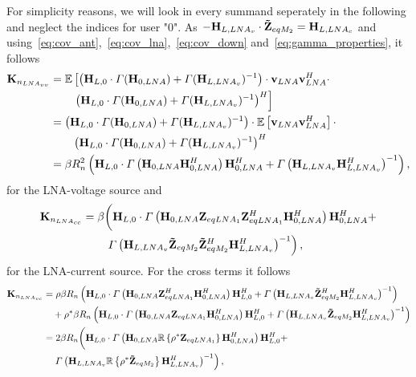 For simplicity reasons, we will look in every summand seperately in the following and neglect the indices for user "0".
As $-\mathbf{H}_{L,LNA_v}\cdot\mathbf{\tilde{Z}}_{eqM_2} = \mathbf{H}_{L,LNA_c}$ and using~\eqref{eq:cov_ant},~\eqref{eq:cov_lna},~\eqref{eq:cov_down} and~\eqref{eq:gamma_properties}, it follows
\begin{align}
\nonumber
\mathbf{K}_{n_{LNA_{vv}}} &= \mathbb{E}\left[\left(\mathbf{H}_{L,0}\cdot\Gamma(\mathbf{H}_{0,LNA})+\Gamma(\mathbf{H}_{L,LNA_v})^{-1}\right)\cdot\mathbf{v}_{LNA}\mathbf{v}_{LNA}^H\cdot\right.\\\nonumber
&\qquad\left.\left(\mathbf{H}_{L,0}\cdot\Gamma(\mathbf{H}_{0,LNA})+\Gamma(\mathbf{H}_{L,LNA_v})^{-1}\right)^H\right]\\\nonumber
&=\left(\mathbf{H}_{L,0}\cdot\Gamma(\mathbf{H}_{0,LNA})+\Gamma(\mathbf{H}_{L,LNA_v})^{-1}\right)\cdot\mathbb{E}\left[\mathbf{v}_{LNA}\mathbf{v}_{LNA}^H\right]\cdot\\\nonumber
&\qquad\left(\mathbf{H}_{L,0}\cdot\Gamma(\mathbf{H}_{0,LNA})+\Gamma(\mathbf{H}_{L,LNA_v})^{-1}\right)^H\\
&=\beta R_n^2\left(\mathbf{H}_{L,0}\cdot\Gamma\left(\mathbf{H}_{0,LNA}\mathbf{H}_{0,LNA}^H\right)\mathbf{H}_{0,LNA}^H+\Gamma\left(\mathbf{H}_{L,LNA_v}\mathbf{H}_{L,LNA_v}^H\right)^{-1}\right),
\end{align}
for the LNA-voltage source and
\begin{align}
\nonumber
\mathbf{K}_{n_{LNA_{cc}}} &= 
\beta \biggl(\mathbf{H}_{L,0}\cdot\Gamma\left(\mathbf{H}_{0,LNA}\mathbf{Z}_{eqLNA_1}\mathbf{Z}_{eqLNA_1}^H\mathbf{H}_{0,LNA}^H\right)\mathbf{H}_{0,LNA}^H+\\
&\qquad\left.\Gamma\left(\mathbf{H}_{L,LNA_v}\mathbf{\tilde{Z}}_{eqM_2}\mathbf{\tilde{Z}}_{eqM_2}^H\mathbf{H}_{L,LNA_v}^H\right)^{-1}\right),
\end{align}
for the LNA-current source.
For the cross terms it follows
\begin{align}
\nonumber
\mathbf{K}_{n_{LNA_{vc}}} &= \rho\beta R_n
\left(\mathbf{H}_{L,0}\cdot\Gamma\left(\mathbf{H}_{0,LNA}\mathbf{Z}_{eqLNA_1}^H\mathbf{H}_{0,LNA}^H\right)\mathbf{H}_{L,0}^H + 
\Gamma\left(\mathbf{H}_{L,LNA_v}\mathbf{\tilde{Z}}_{eqM_2}^H\mathbf{H}_{L,LNA_v}^H\right)^{-1}\right)\\\nonumber
&\quad+
\rho^*\beta R_n
\left(\mathbf{H}_{L,0}\cdot\Gamma\left(\mathbf{H}_{0,LNA}\mathbf{Z}_{eqLNA_1}\mathbf{H}_{0,LNA}^H\right)\mathbf{H}_{L,0}^H + 
\Gamma\left(\mathbf{H}_{L,LNA_v}\mathbf{\tilde{Z}}_{eqM_2}\mathbf{H}_{L,LNA_v}^H\right)^{-1}\right)\\\nonumber
&= 2 \beta R_n\biggl(
\mathbf{H}_{L,0}\cdot\Gamma\left(\mathbf{H}_{0,LNA}\mathbb{R}\left\{\rho^*\mathbf{Z}_{eqLNA_1}\right\}\mathbf{H}_{0,LNA}^H\right)\mathbf{H}_{L,0}^H + \\
&\quad\left.\Gamma\left(\mathbf{H}_{L,LNA_v}\mathbb{R}\left\{\rho^*\mathbf{\tilde{Z}}_{eqM_2}\right\}\mathbf{H}_{L,LNA_v}^H\right)^{-1}\right),
\end{align}
